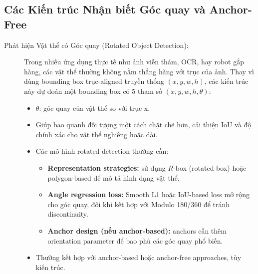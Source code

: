 \subsection{Các Kiến trúc Nhận biết Góc quay và Anchor-Free}
\label{subsec:angle_aware_anchor_free}

\begin{description}
	\item[Phát hiện Vật thể có Góc quay (Rotated Object Detection):] 
	Trong nhiều ứng dụng thực tế như ảnh viễn thám, OCR, hay robot gắp hàng, các vật thể thường không nằm thẳng hàng với trục của ảnh. Thay vì dùng bounding box trục-aligned truyền thống $(x, y, w, h)$, các kiến trúc này dự đoán một bounding box có 5 tham số $(x, y, w, h, \theta)$:
	\begin{itemize}
		\item $\theta$: góc quay của vật thể so với trục x.
		\item Giúp bao quanh đối tượng một cách chặt chẽ hơn, cải thiện IoU và độ chính xác cho vật thể nghiêng hoặc dài.
		\item Các mô hình rotated detection thường cần:
		\begin{itemize}
			\item \textbf{Representation strategies:} sử dụng $R$-box (rotated box) hoặc polygon-based để mô tả hình dạng vật thể.
			\item \textbf{Angle regression loss:} Smooth L1 hoặc IoU-based loss mở rộng cho góc quay, đôi khi kết hợp với Modulo 180/360 để tránh discontinuity.
			\item \textbf{Anchor design (nếu anchor-based):} anchors cần thêm orientation parameter để bao phủ các góc quay phổ biến.
		\end{itemize}
		\item Thường kết hợp với anchor-based hoặc anchor-free approaches, tùy kiến trúc.
	\end{itemize}
	

\end{description}
